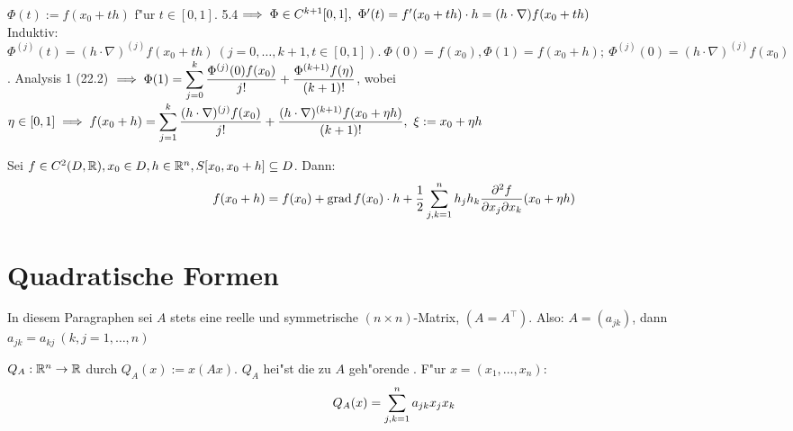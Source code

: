 \documentclass[a4paper,twoside,DIV15,BCOR12mm,chapterprefix=true,headings=twolinechapter]{scrbook}
\begin{document}
\begin{beweis}
$\Phi(t):=f(x_0+th)$ f"ur $t\in[0,1]$. 5.4$\folgt \Phi \in C^{k+1}[0,1],\ \Phi'(t)=f'(x_0+th) \cdot h=(h \cdot \nabla)f(x_0+th)$\\
Induktiv: $\Phi^{(j)}(t)=(h\cdot\nabla)^{(j)}f(x_0+th)\ (j=0,\ldots,k+1, t\in[0,1]).\ \Phi(0)=f(x_0), \Phi(1)=f(x_0+h);\ \Phi^{(j)}(0)=(h\cdot\nabla)^{(j)}f(x_0)$. Analysis 1 (22.2) $\implies \Phi(1)=\displaystyle\sum_{j=0}^k\frac{\Phi^{(j)}(0)f(x_0)}{j!}+\frac{\Phi^{(k+1)}f(\eta)}{(k+1)!}$, wobei $\eta\in[0,1]\implies f(x_0+h)=\displaystyle\sum_{j=1}^k\frac{(h\cdot\nabla)^{(j)}f(x_0)}{j!}+\frac{(h\cdot\nabla)^{(k+1)}f(x_0+\eta h)}{(k+1)!},\ \xi:=x_0+\eta h$
\end{beweis}

\begin{spezialfall}
Sei $f\in C^2(D,\mathbb{R}),x_0\in D, h\in \mathbb{R}^n, S[x_0,x_0+h]\subseteq D$. Dann: 
$$f(x_0+h)=f(x_0)+\grad f(x_0)\cdot h+\frac{1}{2}\sum_{j,k=1}^nh_jh_k\frac{\partial^2 f}{\partial x_j\partial x_k}(x_0+\eta h)$$
\end{spezialfall}

\chapter{Quadratische Formen}
\def\grad{\mathop{\rm grad}\nolimits}

\begin{vereinbarung}
In diesem Paragraphen sei $A$ stets eine reelle und symmetrische $(n\times n)$-Matrix, $(A=A^\top)$. Also: $A=(a_{jk})$, dann $a_{jk}=a_{kj}\ (k,j=1,\ldots,n)$ 
\end{vereinbarung}

\begin{definition*}
$Q_A:\mathbb{R}^n\to\mathbb{R}$ durch $Q_A(x):=x(Ax)$. $Q_A$ hei"st die zu $A$ geh"orende . F"ur $x=(x_1,\ldots,x_n):$
$$Q_A(x)=\displaystyle\sum_{j,k=1}^na_{jk}x_jx_k$$
\end{definition*}
\end{document}
